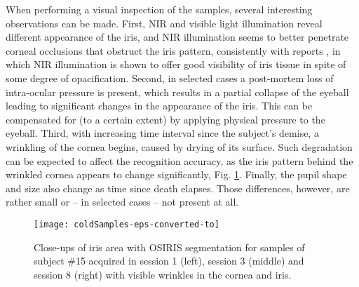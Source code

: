 \documentclass[10pt,twocolumn,letterpaper]{article}
\begin{document}
\label{sec:visualInspection}
When performing a visual inspection of the samples, several interesting observations can be made. First, NIR and visible light illumination reveal different appearance of the iris, and NIR illumination seems to better penetrate corneal occlusions that obstruct the iris pattern, consistently with reports \cite{Aslam,TrokielewiczBTAS2015}, in which NIR illumination is shown to offer good visibility of iris tissue in spite of some degree of opacification. Second, in selected cases a post-mortem loss of intra-ocular pressure is present, which results in a partial collapse of the eyeball leading to significant changes in the appearance of the iris. This can be compensated for (to a certain extent) by applying physical pressure to the eyeball. Third, with increasing time interval since the subject's demise, a wrinkling of the cornea begins, caused by drying of its surface. Such degradation can be expected to affect the recognition accuracy, as the iris pattern behind the wrinkled cornea appears to change significantly, Fig. \ref{fig:coldSamples}. Finally, the pupil shape and size also change as time since death elapses. Those differences, however, are rather small or -- in selected cases -- not present at all.

\begin{figure}[!htb]
\centering
\texttt{[image: coldSamples-eps-converted-to]}
\caption{Close-ups of iris area with OSIRIS segmentation for samples of subject \#15 acquired in session 1 (left), session 3 (middle) and session 8 (right) with visible wrinkles in the cornea and iris.}
\label{fig:coldSamples}
\end{figure}
\end{document}
